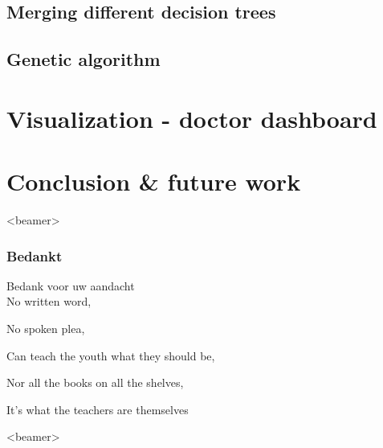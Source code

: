 \documentclass[english]{beamer}
\begin{document}
\subsection*{Merging different decision trees}

\subsection*{Genetic algorithm}
\section{Visualization - doctor dashboard}
\section{Conclusion \& future work}






\begin{frame}<beamer> 
  \frametitle{Bedankt}
	  {\huge \color{ugentyellow} Bedank voor uw aandacht}\\
	  No written word,
	  
	  No spoken plea,
	  
	  Can teach the youth what they should be,
	  
	  Nor all the books on all the shelves,
	  
	  It's what the teachers are themselves 
\end{frame}

\begin{frame}<beamer> 
	\small
	\tableofcontents
\end{frame}
\end{document}
